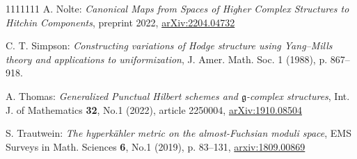 \documentclass[11pt]{amsart}
\numberwithin{thm}{section} %
\numberwithin{equation}{section} %
\numberwithin{figure}{section} %
\newcommand*{\g}{\mathfrak{g}}
\begin{document}
\begin{thebibliography}{1111111}
A. Nolte: \textit{Canonical Maps from Spaces of Higher Complex Structures to Hitchin Components}, preprint 2022, \href{https://arxiv.org/pdf/2204.04732.pdf}{arXiv:2204.04732}

C. T. Simpson: \textit{Constructing  variations  of  Hodge  structure  using  Yang–Mills  theory  and  applications  to uniformization}, J. Amer. Math. Soc. 1 (1988), p. 867–918.

A. Thomas: \textit{Generalized Punctual Hilbert schemes and $\g$-complex structures}, Int. J. of Mathematics \textbf{32}, No.1 (2022), article 2250004, \href{https://arxiv.org/pdf/1910.08504.pdf}{arXiv:1910.08504}

S. Trautwein: \textit{The hyperkähler metric on the almost-Fuchsian moduli space}, EMS Surveys in Math. Sciences \textbf{6}, No.1 (2019), p. 83--131, \href{https://arxiv.org/abs/1809.00869}{arxiv:1809.00869}

\end{thebibliography}
\end{document}
